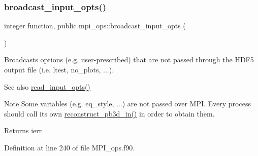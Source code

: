 \subsubsection{\texorpdfstring{broadcast\+\_\+input\+\_\+opts()}{broadcast\_input\_opts()}}
{\footnotesize\ttfamily integer function, public mpi\+\_\+ops\+::broadcast\+\_\+input\+\_\+opts (\begin{DoxyParamCaption}{ }\end{DoxyParamCaption})}



Broadcasts options (e.\+g. user-\/prescribed) that are not passed through the H\+D\+F5 output file (i.\+e. {\ttfamily ltest}, {\ttfamily no\+\_\+plots}, ...). 

\begin{DoxySeeAlso}{See also}
\hyperlink{namespaceinput__ops_a434acca4f59f9dc1d91e04f846133684}{read\+\_\+input\+\_\+opts()}
\end{DoxySeeAlso}
\begin{DoxyNote}{Note}
Some variables (e.\+g. {\ttfamily eq\+\_\+style}, ...) are not passed over M\+PI. Every process should call its own \hyperlink{namespacepb3d__ops_ad1481747b9b9832f816d4bf1dd2d6737}{reconstruct\+\_\+pb3d\+\_\+in()} in order to obtain them.
\end{DoxyNote}
\begin{DoxyReturn}{Returns}
ierr 
\end{DoxyReturn}


Definition at line 240 of file M\+P\+I\+\_\+ops.\+f90.

